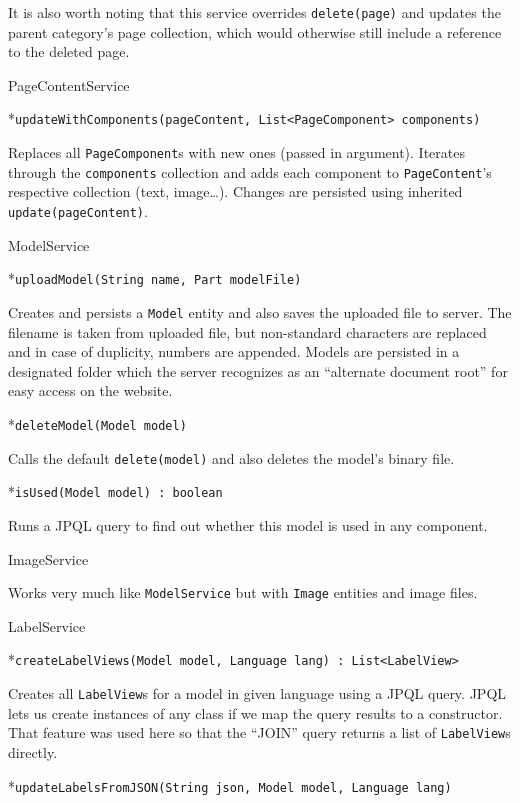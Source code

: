 It is also worth noting that this service overrides {\tt delete(page)} and updates the parent category’s page collection, which would otherwise still include a reference to the deleted page.

\secc PageContentService

\begitems

*{\tt updateWithComponents(pageContent, List<PageComponent> components)}

Replaces all {\tt PageComponent}s with new ones (passed in argument). Iterates through the {\tt components} collection and adds each component to {\tt PageContent}’s respective collection (text, image…). Changes are persisted using inherited {\tt update(pageContent)}.

\enditems

\secc ModelService

\begitems

*{\tt uploadModel(String name, Part modelFile)}

Creates and persists a {\tt Model} entity and also saves the uploaded file to server. The filename is taken from uploaded file, but non-standard characters are replaced and in case of duplicity, numbers are appended. Models are persisted in a designated folder which the server recognizes as an “alternate document root” for easy access on the website.

*{\tt deleteModel(Model model)}

Calls the default {\tt delete(model)} and also deletes the model’s binary file.

*{\tt isUsed(Model model) : boolean}

Runs a JPQL query to find out whether this model is used in any component.

\enditems

\secc ImageService

Works very much like {\tt ModelService} but with {\tt Image} entities and image files.

\secc LabelService

\begitems

*{\tt createLabelViews(Model model, Language lang) : List<LabelView>}

Creates all {\tt LabelView}s for a model in given language using a JPQL query. JPQL lets us create instances of any class if we map the query results to a constructor. That feature was used here so that the “JOIN” query returns a list of {\tt LabelView}s directly.

*{\tt updateLabelsFromJSON(String json, Model model, Language lang)}

